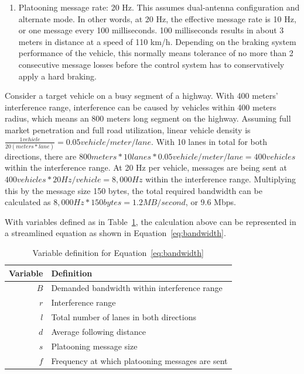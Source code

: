 \documentclass[12pt]{report}
\begin{document}
\begin{enumerate}
  \item Platooning message rate: 20 Hz. This assumes dual-antenna configuration and alternate mode. In other words, at 20 Hz, the effective message rate is 10 Hz, or one message every 100 milliseconds. 100 milliseconds results in about 3 meters in distance at a speed of 110 km/h. Depending on the braking system performance of the vehicle, this normally means tolerance of no more than 2 consecutive message losses before the control system has to conservatively apply a hard braking.
\end{enumerate}

Consider a target vehicle on a busy segment of a highway. With 400 meters' interference range, interference can be caused by vehicles within 400 meters radius, which means an 800 meters long segment on the highway. Assuming full market penetration and full road utilization, linear vehicle density is $\frac{1 vehicle}{20 (meters*lane)}=0.05 vehicle/meter/lane$. With 10 lanes in total for both directions, there are $800 meters * 10 lanes * 0.05 vehicle/meter/lane = 400 vehicles$ within the interference range. At 20 Hz per vehicle, messages are being sent at $400 vehicles * 20 Hz/vehicle=8,000 Hz$ within the interference range. Multiplying this by the message size 150 bytes, the total required bandwidth can be calculated as $8,000 Hz * 150 bytes = 1.2 MB/second$, or 9.6 Mbps.

With variables defined as in Table~\ref{tab:bandwidth_equation_variable}, the calculation above can be represented in a streamlined equation as shown in Equation~\ref{eq:bandwidth}.

\begin{table}[h]
  \begin{center}
    \begin{tabular}{r l}
      \hline
      Variable & Definition \\ \hline
      $B$ & Demanded bandwidth within interference range \\
      $r$ & Interference range \\
      $l$ & Total number of lanes in both directions \\
      $d$ & Average following distance \\
      $s$ & Platooning message size \\
      $f$ & Frequency at which platooning messages are sent \\ \hline
    \end{tabular}
    \caption{\label{tab:bandwidth_equation_variable}Variable definition for Equation~\ref{eq:bandwidth}}
  \end{center}
\end{table}
\end{document}
